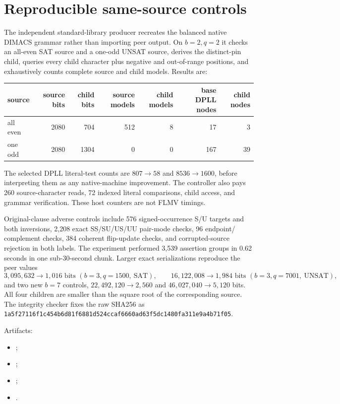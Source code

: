 \documentclass[11pt]{article}
\begin{document}
\section{Reproducible same-source controls}
The independent standard-library producer recreates the balanced native
DIMACS grammar rather than importing peer output.  On $b=2,q=2$ it checks an
all-even SAT source and a one-odd UNSAT source, derives the distinct-pin child,
queries every child character plus negative and out-of-range positions, and
exhaustively counts complete source and child models.  Results are:
\begin{center}\begin{tabular}{lrrrrrr}
\toprule
source & source bits & child bits & source models & child models & base DPLL nodes & child nodes\\\midrule
all even & 2080&704&512&8&17&3\\
one odd & 2080&1304&0&0&167&39\\\bottomrule
\end{tabular}\end{center}
The selected DPLL literal-test counts are $807\to58$ and $8536\to1600$,
before interpreting them as any native-machine improvement.  The controller
also pays 260 source-character reads, 72 indexed literal comparisons, child
access, and grammar verification.  These host counters are not FLMV timings.

Original-clause adverse controls include 576 signed-occurrence S/U targets and
both inversions, 2,208 exact SS/SU/US/UU pair-mode checks, 96 endpoint/
complement checks, 384 coherent flip-update checks, and corrupted-source
rejection in both labels.  The experiment performed 3,539 assertion groups in
0.62 seconds in one sub-30-second chunk.  Larger exact serializations reproduce
the peer values
\[
 3{,}095{,}632\to1{,}016\text{ bits }(b=3,q=1500,\ \mathrm{SAT}),\qquad
 16{,}122{,}008\to1{,}984\text{ bits }(b=3,q=7001,\ \mathrm{UNSAT}),
\]
and two new $b=7$ controls, $22{,}492{,}120\to2{,}560$ and
$46{,}027{,}040\to5{,}120$ bits.  All four children are smaller than the
square root of the corresponding source.  The integrity checker fixes the raw
SHA256 as
\texttt{1a5f27116f1c454b6d81f6881d524ccaf6660ad63f5dc1480fa311e9a4b71f05}.

Artifacts:
\begin{itemize}
\item {};
\item {};
\item {};
\item {}.
\end{itemize}
\end{document}
